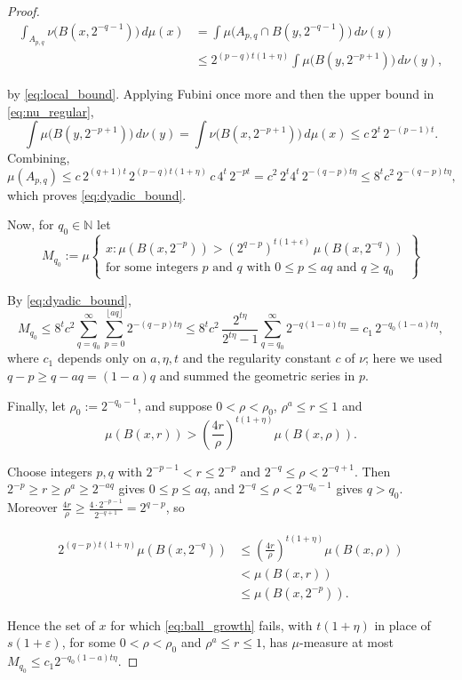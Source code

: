 \documentclass[12pt]{amsart}
\theoremstyle{definition}
\theoremstyle{remark}
\numberwithin{equation}{section}
\begin{document}
\begin{proof}
\begin{align*}
\int_{A_{p,q}}\nu\bigl(B(x,2^{-q-1})\bigr)\,d\mu(x)
&=\int \mu\bigl(A_{p,q}\cap B(y,2^{-q-1})\bigr)\,d\nu(y)\\
&\leq 2^{(p-q)t(1+\eta)}\int\mu\bigl(B(y,2^{-p+1})\bigr)\,d\nu(y),    
\end{align*}

by \eqref{eq:local_bound}. Applying Fubini once more and then the upper bound in \eqref{eq:nu_regular},
$$\int\mu\bigl(B(y,2^{-p+1})\bigr)\,d\nu(y)
=\int\nu\bigl(B(x,2^{-p+1})\bigr)\,d\mu(x)
\leq c\,2^{t}\,2^{-(p-1)t}.$$
Combining,
$$\mu(A_{p,q})\leq c\,2^{(q+1)t}\, 2^{(p-q)t(1+\eta)}\, c\,4^{t}\,2^{-pt}
= c^{2}\,2^{t}4^{t}\,2^{-(q-p)t\eta}\leq 8^{t}c^{2}\,2^{-(q-p)t\eta},$$
which proves \eqref{eq:dyadic_bound}.

Now, for $q_0\in\mathbb{N}$ let
$$
M_{q_0}:=\mu\left\{\begin{array}{l}
x : \mu(B(x,2^{-p})) > (2^{q-p})^{t(1+\epsilon)}\,\mu(B(x,2^{-q})) \\[4pt]
\text{for some integers } p \text{ and } q \text{ with } 0\leq p\leq aq \text{ and } q\geq q_0
\end{array}
\right\}$$

By \eqref{eq:dyadic_bound},
$$M_{q_0}\leq 8^{t}c^{2}\sum_{q=q_0}^{\infty}\sum_{p=0}^{\lfloor aq\rfloor}
2^{-(q-p)t\eta}
\leq 8^{t}c^{2}\,\frac{2^{t\eta}}{2^{t\eta}-1}\sum_{q=q_0}^{\infty}2^{-q(1-a)t\eta}
=c_{1}\,2^{-q_{0}(1-a)t\eta},$$
where $c_{1}$ depends only on $a,\eta,t$ and the regularity constant $c$
of $\nu$; here we used $q-p\geq q-aq=(1-a)q$ and summed the geometric
series in $p$.

Finally, let $\rho_{0}:=2^{-q_{0}-1}$,
and suppose $0<\rho<\rho_{0}$, $\rho^{a}\leq r\leq 1$ and
$$\mu(B(x,r))>\left(\frac{4r}{\rho}\right)^{t(1+\eta)}\mu(B(x,\rho)).$$


Choose integers $p,q$ with $2^{-p-1}<r\leq 2^{-p}$ and
$2^{-q}\leq\rho<2^{-q+1}$. Then $2^{-p}\geq r\geq\rho^{a}\geq 2^{-aq}$
gives $0\leq p\leq aq$, and $2^{-q}\leq\rho<2^{-q_{0}-1}$ gives
$q>q_{0}$. Moreover $\frac{4r}{\rho}\geq\frac{4\cdot 2^{-p-1}}{2^{-q+1}}
=2^{q-p}$, so

\begin{align*}
    2^{(q-p)t(1+\eta)}\mu(B(x,2^{-q}))&\leq \left(\tfrac{4r}{\rho}\right)^{t(1+\eta)}\mu(B(x,\rho))\\
    &<\mu(B(x,r))\\
    &\leq \mu(B(x,2^{-p})).
\end{align*}

Hence the set of $x$ for which \eqref{eq:ball_growth} fails, with
$t(1+\eta)$ in place of $s(1+\varepsilon)$, for some
$0<\rho<\rho_{0}$ and $\rho^{a}\leq r\leq 1$, has $\mu$-measure at most
$M_{q_{0}}\leq c_{1}2^{-q_{0}(1-a)t\eta}$.


\end{proof}
\end{document}
